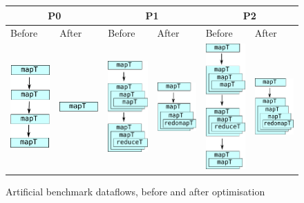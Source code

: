 \begin{figure}
\begin{tabular}{p{1.6cm}|p{1.6cm}|p{1.6cm}|p{1.6cm}|p{1.6cm}|p{1.6cm}}
\multicolumn{2}{c}{\textbf{P0}} & \multicolumn{2}{c}{\textbf{P1}} & \multicolumn{2}{c}{\textbf{P2}} \\
\hline
Before & After & Before & After & Before & After \\
\includegraphics[width=1.6cm]{img/BlackScholes-unfused.pdf} &
\includegraphics[width=1.6cm]{img/BlackScholes-fused.pdf} &
\includegraphics[width=1.6cm]{img/MatMultFun-unfused.pdf} &
\includegraphics[width=1.6cm]{img/MatMultFun-fused.pdf} &
\includegraphics[width=1.6cm]{img/BabyBear-unfused.pdf} &
\includegraphics[width=1.6cm]{img/BabyBear-fused.pdf}
\end{tabular}
\caption{Artificial benchmark dataflows, before and after optimisation}
\label{fig:artificial-dataflows}
\end{figure}

